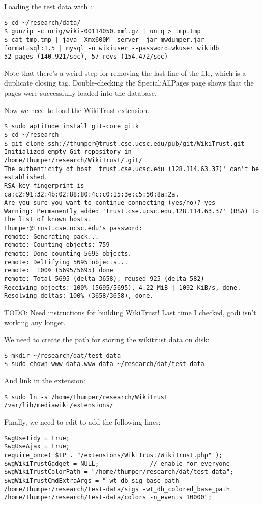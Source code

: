 Loading the test data with :
\begin{verbatim}
$ cd ~/research/data/
$ gunzip -c orig/wiki-00114050.xml.gz | uniq > tmp.tmp
$ cat tmp.tmp | java -Xmx600M -server -jar mwdumper.jar --format=sql:1.5 | mysql -u wikiuser --password=wkuser wikidb
52 pages (140.921/sec), 57 revs (154.472/sec)
\end{verbatim}
Note that there's a weird step for removing the last line of
the file, which is a duplicate closing tag.
Double-checking the Special:AllPages page shows that
the pages were successfully loaded into the database.

Now we need to load the WikiTrust extension.
\begin{verbatim}
$ sudo aptitude install git-core gitk
$ cd ~/research
$ git clone ssh://thumper@trust.cse.ucsc.edu/pub/git/WikiTrust.git
Initialized empty Git repository in /home/thumper/research/WikiTrust/.git/
The authenticity of host 'trust.cse.ucsc.edu (128.114.63.37)' can't be established.
RSA key fingerprint is ca:c2:91:32:4b:02:88:80:4c:c0:15:3e:c5:50:8a:2a.
Are you sure you want to continue connecting (yes/no)? yes
Warning: Permanently added 'trust.cse.ucsc.edu,128.114.63.37' (RSA) to the list of known hosts.
thumper@trust.cse.ucsc.edu's password: 
remote: Generating pack...
remote: Counting objects: 759
remote: Done counting 5695 objects.
remote: Deltifying 5695 objects...
remote:  100% (5695/5695) done
remote: Total 5695 (delta 3658), reused 925 (delta 582)
Receiving objects: 100% (5695/5695), 4.22 MiB | 1092 KiB/s, done.
Resolving deltas: 100% (3658/3658), done.
\end{verbatim}

TODO: Need instructions for building WikiTrust!  Last time I checked,
godi isn't working any longer.

We need to create the path for storing the wikitrust data on disk:
\begin{verbatim}
$ mkdir ~/research/dat/test-data
$ sudo chown www-data.www-data ~/research/dat/test-data
\end{verbatim}
And link in the extension:
\begin{verbatim}
$ sudo ln -s /home/thumper/research/WikiTrust /var/lib/mediawiki/extensions/
\end{verbatim}

Finally, we need to edit  to add the following lines:
\begin{verbatim}
$wgUseTidy = true;
$wgUseAjax = true;
require_once( $IP . "/extensions/WikiTrust/WikiTrust.php" );
$wgWikiTrustGadget = NULL;              // enable for everyone
$wgWikiTrustColorPath = "/home/thumper/research/dat/test-data";
$wgWikiTrustCmdExtraArgs = "-wt_db_sig_base_path /home/thumper/research/test-data/sigs -wt_db_colored_base_path /home/thumper/research/test-data/colors -n_events 10000";
\end{verbatim}

